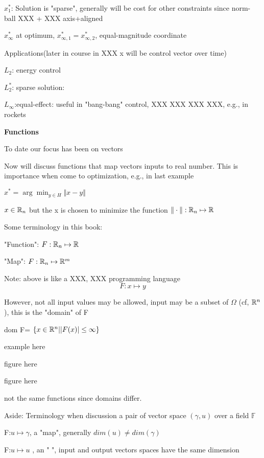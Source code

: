 $x_{1}^{*}$: Solution is "sparse", generally will be cost for other constraints since norm-ball XXX + XXX axis+aligned

$x_{\infty}^{*}$ at optimum, $x_{\infty, 1}^{*}=x_{\infty, 2}^{*}$, equal-magnitude coordinate

Applications(later in course in XXX x will be control vector over time)

$L_{2}$: energy control


$L_{2}^{*}$: sparse solution:


$L_{\infty}$:equal-effect: useful in "bang-bang" control, XXX XXX XXX XXX, e.g., in rockets


\vspace{0.5cm}
\noindent\textbf{Functions}

To date our focus has been on vectors

Now will discuss functions that map vectors inputs to real number. This is importance when come to optimization, e.g., in last example

$x^{*}=\arg\min_{y\in H} \Vert x-y\Vert$

$x\in\mathbb{R}_{n}$ but the x is chosen to minimize the function $\Vert\cdot\Vert :\mathbb{R}_{n}\mapsto\mathbb{R}$

Some terminology in this book:

"Function":  $F:\mathbb{R}_{n}\mapsto \mathbb{R}$

"Map":  $F:\mathbb{R}_{n}\mapsto \mathbb{R}^{m}$

Note: above is like a XXX, XXX programming language
$$F: x \mapsto y$$

However, not all input values may be allowed, input may be a subset of $\Omega$ (cf, $\mathbb{R}^{n}$), this is the "domain" of F

dom F= $\{x\in\mathbb{R}^{n}|\vert F(x)\vert\leq\infty\}$



example here

figure here

figure here



not the same functions since domains differ.



Aside: Terminology when discussion a pair of vector space $(\gamma,u)$ over a field $\mathbb{F}$

F:$u\mapsto \gamma$, a "map", generally $dim(u)\neq dim(\gamma)$

F:$u\mapsto u$ , an "   ", input and output vectors spaces have the same dimension

